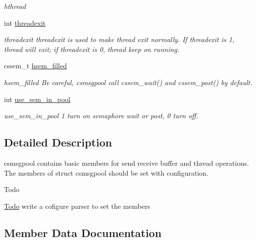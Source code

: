 \begin{DoxyCompactItemize}
\begin{DoxyCompactList}\small\item\em hthread \end{DoxyCompactList}\item 
int \hyperlink{structcsmsgpool_a7d814c8195e4baacad1f4045c8e63ad8}{threadexit}
\begin{DoxyCompactList}\small\item\em threadexit threadexit is used to make thread exit normally. If threadexit is 1, thread will exit; if threadexit is 0, thread keep on running. \end{DoxyCompactList}\item 
\hypertarget{structcsmsgpool_a3e8ddb48e68c25fb6874520af10d58be}{}cssem\+\_\+t \hyperlink{structcsmsgpool_a3e8ddb48e68c25fb6874520af10d58be}{hsem\+\_\+filled}\label{structcsmsgpool_a3e8ddb48e68c25fb6874520af10d58be}

\begin{DoxyCompactList}\small\item\em hsem\+\_\+filled Be careful, csmsgpool call cssem\+\_\+wait() and cssem\+\_\+post() by default. \end{DoxyCompactList}\item 
int \hyperlink{structcsmsgpool_ab79b44d003c02515c83d5772eb53c937}{use\+\_\+sem\+\_\+in\+\_\+pool}
\begin{DoxyCompactList}\small\item\em use\+\_\+sem\+\_\+in\+\_\+pool 1 turn on semaphore wait or post, 0 turn off. \end{DoxyCompactList}\end{DoxyCompactItemize}


\subsection{Detailed Description}
csmsgpool contains basic members for send receive buffer and thread operations. The members of struct csmsgpool should be set with configuration. 

\begin{DoxyRefDesc}{Todo}
\item[\hyperlink{todo__todo000003}{Todo}]write a cofigure parser to set the members \end{DoxyRefDesc}


\subsection{Member Data Documentation}
\hypertarget{structcsmsgpool_a7d814c8195e4baacad1f4045c8e63ad8}{}
